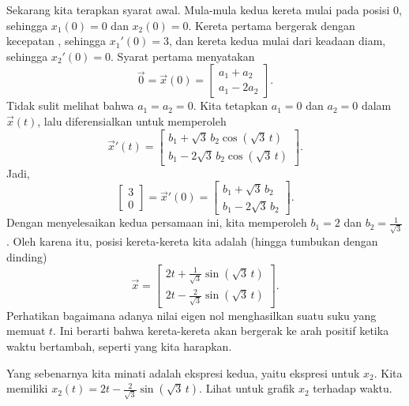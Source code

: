 \begin{example}
Sekarang kita terapkan syarat awal.  Mula-mula kedua kereta mulai pada posisi 0,
sehingga $x_1 (0) = 0$ dan $x_2(0) = 0$.  Kereta pertama bergerak dengan kecepatan
,
sehingga $x_1'(0) = 3$, dan kereta kedua mulai dari keadaan diam, sehingga $x_2'(0) = 0$.
Syarat pertama menyatakan
\begin{equation*}
\vec{0} = \vec{x}(0) = 
\begin{bmatrix}
a_1 + a_2 \\
a_1 - 2 a_2 
\end{bmatrix} .
\end{equation*}
Tidak sulit melihat bahwa $a_1 = a_2 = 0$.  Kita tetapkan $a_1=0$
dan $a_2=0$ dalam $\vec{x}(t)$,
lalu diferensialkan untuk memperoleh
\begin{equation*}
{\vec{x}}'(t)
=
\begin{bmatrix}
b_1 + \sqrt{3} \, b_2 \cos ( \sqrt{3} \, t ) \\
b_1 - 2 \sqrt{3} \, b_2 \cos ( \sqrt{3} \, t )
\end{bmatrix} .
\end{equation*}
Jadi,
\begin{equation*}
\begin{bmatrix} 3 \\ 0 \end{bmatrix} = 
{\vec{x}}'(0)
=
\begin{bmatrix}
b_1 + \sqrt{3} \, b_2 \\
b_1 - 2 \sqrt{3} \, b_2 
\end{bmatrix} .
\end{equation*}
Dengan menyelesaikan kedua persamaan ini, kita
memperoleh $b_1 = 2$ dan $b_2 =
\frac{1}{\sqrt{3}}$.  Oleh karena itu, posisi kereta-kereta kita adalah
(hingga tumbukan dengan dinding)
\begin{equation*}
\vec{x} = 
\begin{bmatrix}
2 t + \frac{1}{\sqrt{3}} \sin ( \sqrt{3} \, t ) \\
2 t - \frac{2}{\sqrt{3}} \sin ( \sqrt{3} \, t )
\end{bmatrix} .
\end{equation*}
Perhatikan bagaimana adanya nilai eigen nol menghasilkan suatu suku yang memuat $t$.
Ini berarti bahwa kereta-kereta akan bergerak ke arah positif ketika
waktu bertambah, seperti yang kita harapkan.


Yang sebenarnya kita minati adalah ekspresi kedua, yaitu ekspresi untuk $x_2$.
Kita memiliki $x_2(t) = 
2 t - \frac{2}{\sqrt{3}} \sin ( \sqrt{3} \, t)$.  Lihat 
untuk grafik $x_2$ terhadap waktu.


\end{example}
